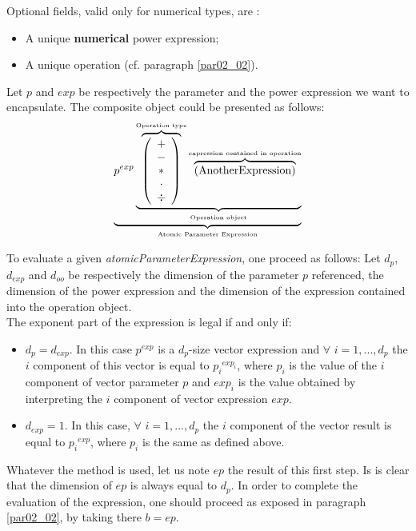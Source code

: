 \documentclass[a4paper,11pt] {article}
\begin{document}
Optional fields, valid only for numerical types, are : 
\begin{itemize}
\item A unique {\bf numerical} power expression;
\item A unique operation (cf. paragraph \ref{par02_02}).\\
\end{itemize}
Let $p$ and $exp$ be respectively the parameter and the power expression we want to encapsulate. The composite object could be presented as follows:
\begin{equation}\label{eq01}
 \underbrace{  p^{exp} \underbrace{  \overbrace{\left( \begin{array}{c} + \\ - \\ \ast  \\ \cdot \\ \div   \end{array} \right) }^{\mbox{\tiny Operation type}}
 \overbrace{    \left( \mbox{AnotherExpression}\right) }^{\mbox{\tiny expression contained in operation}}   }_{\mbox{\tiny Operation object}}}_{\mbox{\tiny Atomic Parameter Expression}}
\end{equation}

To evaluate a given {\it atomicParameterExpression}, one proceed as follows: 
Let $d_p$, $d_{exp}$ and $d_{oo}$ be respectively the dimension of the parameter $p$ referenced, the dimension of the power expression and the dimension of the expression contained into the operation object.\\
The exponent part of the expression is legal if and only if:
\begin{itemize}
\item $d_p=d_{exp}$. In this case $p^{exp}$ is a $d_p$-size vector expression and $\forall$ $i=1,...,d_p$ the $i$ component of this vector is equal to ${p_i}^{exp_i}$, where $p_i$ is the value of the $i$ component of vector parameter $p$ and $exp_i$ is the value obtained by interpreting the $i$ component of vector expression $exp$.
\item $d_{exp}=1$. In this case, $\forall$ $i=1,...,d_p$ the $i$ component of the vector result is equal to ${p_i}^{exp}$, where $p_i$ is the same as defined above.\\
\end{itemize} 

Whatever the method is used, let us note $ep$ the result of this first step. Is is clear that the dimension of $ep$ 
is always equal to $d_p$. In order to complete the evaluation of the expression, one should proceed as exposed in paragraph \ref{par02_02}, by taking there $b=ep$.
\end{document}
